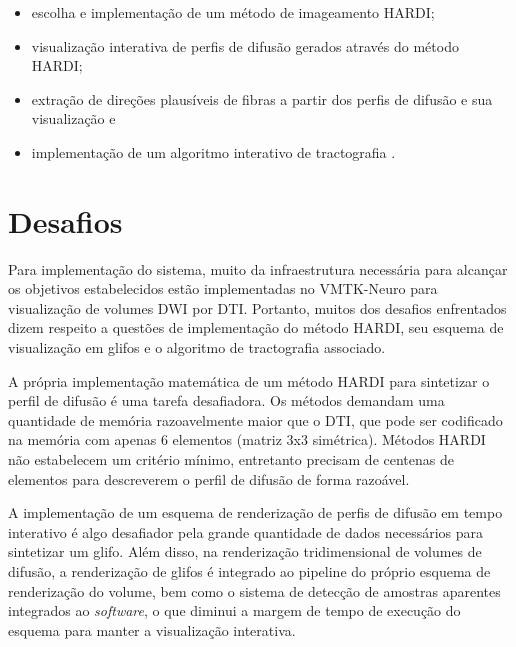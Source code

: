 \documentclass[
    12pt,                %
    oneside,            %
    a4paper,            %
    english,            %
    french,                %
    spanish,            %
    brazil                %
    ]{abntex2}
\begin{document}
\begin{itemize}
\item escolha e implementação de um método de imageamento HARDI; %
\item visualização interativa de perfis de difusão gerados através do método HARDI;
\item extração de direções plausíveis de fibras a partir dos perfis de difusão e sua visualização e
\item implementação de um algoritmo interativo de tractografia .
\end{itemize}






\section{Desafios}
\label{sec::desafios}

Para implementação do sistema, muito da infraestrutura necessária para alcançar os objetivos estabelecidos estão implementadas no VMTK-Neuro para visualização de volumes DWI por DTI. Portanto, muitos dos desafios enfrentados dizem respeito a questões de implementação do método HARDI, seu esquema de visualização em glifos e o algoritmo de tractografia associado.

A própria implementação matemática de um método HARDI para sintetizar o perfil de difusão é uma tarefa desafiadora. Os métodos demandam uma quantidade de memória razoavelmente maior que o DTI, que pode ser codificado na memória com apenas 6 elementos (matriz 3x3 simétrica). Métodos HARDI não estabelecem um critério mínimo, entretanto precisam de centenas de elementos para descreverem o perfil de difusão de forma razoável.

A implementação de um esquema de renderização de perfis de difusão em tempo interativo é algo desafiador pela grande quantidade de dados necessários para sintetizar um glifo. Além disso, na renderização tridimensional de volumes de difusão, a renderização de glifos é integrado ao pipeline do próprio esquema de renderização do volume, bem como o sistema de detecção de amostras aparentes integrados ao \textit{software}, o que diminui a margem de tempo de execução do esquema para manter a visualização interativa.
\end{document}
